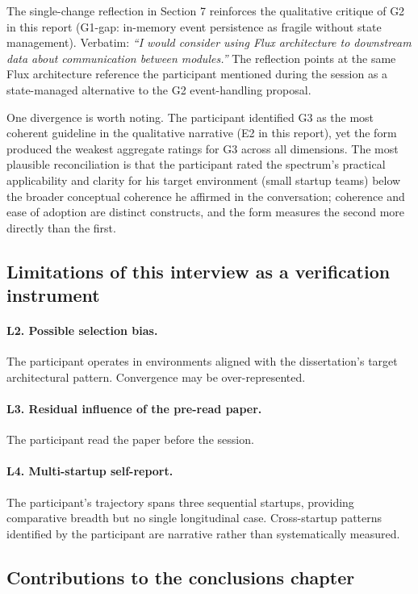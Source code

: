 The single-change reflection in Section 7 reinforces the qualitative critique of G2 in this report (G1-gap: in-memory event persistence as fragile without state management). Verbatim: \emph{``I would consider using Flux architecture to downstream data about communication between modules.''} The reflection points at the same Flux architecture reference the participant mentioned during the session as a state-managed alternative to the G2 event-handling proposal.

One divergence is worth noting. The participant identified G3 as the most coherent guideline in the qualitative narrative (E2 in this report), yet the form produced the weakest aggregate ratings for G3 across all dimensions. The most plausible reconciliation is that the participant rated the spectrum's practical applicability and clarity for his target environment (small startup teams) below the broader conceptual coherence he affirmed in the conversation; coherence and ease of adoption are distinct constructs, and the form measures the second more directly than the first.

\subsection*{Limitations of this interview as a verification instrument}

\paragraph*{L2. Possible selection bias.} The participant operates in environments aligned with the dissertation's target architectural pattern. Convergence may be over-represented.

\paragraph*{L3. Residual influence of the pre-read paper.} The participant read the paper before the session.

\paragraph*{L4. Multi-startup self-report.} The participant's trajectory spans three sequential startups, providing comparative breadth but no single longitudinal case. Cross-startup patterns identified by the participant are narrative rather than systematically measured.

\subsection*{Contributions to the conclusions chapter}

